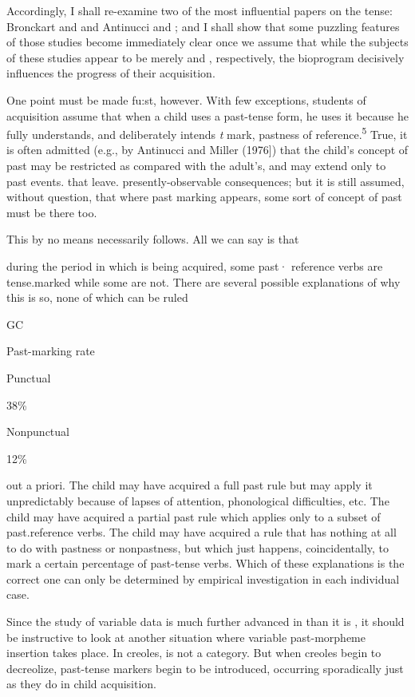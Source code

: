 Accordingly, I shall re-examine two of the most influential papers on the  tense: Bronckart and \citet{Sinclair1973} and Antinucci and \citet{Miller1976}; and I shall show that some puzzling features of those studies become immediately clear once we assume that while the subjects of these studies appear to be merely   and , respectively, the bioprogram decisively influences the progress of their acquisition.

One point must be made fu:st, however. With few exceptions, students of acquisition assume that when a child uses a past-tense form, he uses it because he fully understands, and deliberately intends \textit{t} mark, pastness of reference.\textsuperscript{5} True, it is often admitted (e.g., by Antinucci and Miller (1976]) that the child's concept of past may be restricted as compared with the adult's, and may extend only to past events. that leave. presently-observable consequences; but it is still assumed, without question, that where past marking appears, some sort of concept of past must be there too.

This by no means necessarily follows. All we can say is that

during the period in which  is being acquired, some past· reference verbs are tense.marked while some are not. There are several possible explanations of why this is so, none of which can be ruled

GC

Past-marking rate

Punctual

38\%

Nonpunctual

12\%

out a priori. The child may have acquired a full past rule but may
apply it unpredictably because of lapses of attention, phonological difficulties, etc. The child may have acquired a partial past rule which applies only to a subset of past.reference verbs. The child may have acquired a rule that has nothing at all to do with pastness or non\-pastness, but which just happens, coincidentally, to mark a certain percentage of past-tense verbs. Which of these explanations is the correct one can only be determined by empirical investigation in each individual case.

Since the study of variable data is much further advanced in  than it is , it should be instructive to look at another situation where variable past-morpheme insertion takes place. In creoles,  is not a category. But when creoles begin to decreolize, past-tense markers begin to be introduced, occurring sporadically just as they do in child acquisition.

